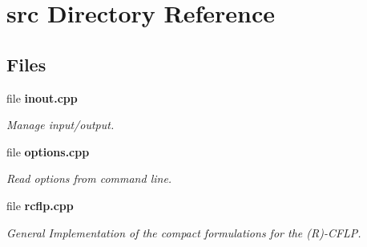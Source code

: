 \section{src Directory Reference}
\label{dir_68267d1309a1af8e8297ef4c3efbcdba}
\subsection*{Files}
\begin{DoxyCompactItemize}
\item 
file \textbf{ inout.\+cpp}
\begin{DoxyCompactList}\small\item\em Manage input/output. \end{DoxyCompactList}\item 
file \textbf{ options.\+cpp}
\begin{DoxyCompactList}\small\item\em Read options from command line. \end{DoxyCompactList}\item 
file \textbf{ rcflp.\+cpp}
\begin{DoxyCompactList}\small\item\em General Implementation of the compact formulations for the (R)-\/\+C\+F\+LP. \end{DoxyCompactList}\end{DoxyCompactItemize}
